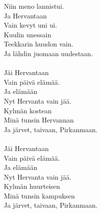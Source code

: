             Niin meno lannistui. \\
            Ja Hervantaan \\
            Vain kevyt uni ui. \\
            Kuulin unessain \\
            Teekkarin huudon vain. \\
            Ja lähdin juomaan uudestaan. \\
\hspace{10mm} \\
            Jäi Hervantaan \\
            Vain päivä elämää. \\
            Ja elämään \\
            Nyt Hervanta vain jää. \\
            Kylmän kostean \\
            Minä tunsin Hervannan \\
            Ja järvet, taivaan, Pirkanmaan. \\
\hspace{10mm} \\
            Jäi Hervantaan \\
            Vain päivä elämää. \\
            Ja elämään \\
            Nyt Hervanta vain jää. \\
            Kylmän huurteisen \\
            Minä tunsin kampuksen \\
            Ja järvet, taivaan, Pirkanmaan. \\
